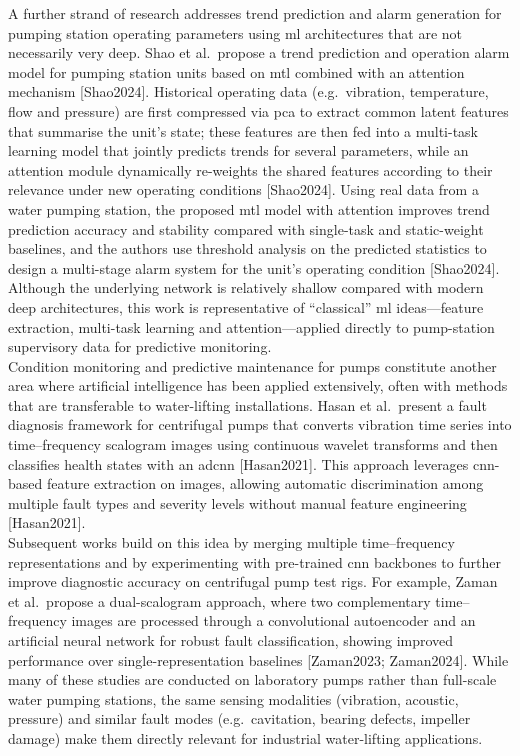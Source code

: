 A further strand of research addresses trend prediction and alarm generation for pumping station operating parameters using \acrshort{ml} architectures that are not necessarily very deep. Shao et al.\ propose a trend prediction and operation alarm model for pumping station units based on \acrfull{mtl} combined with an attention mechanism [Shao2024]. Historical operating data (e.g.\ vibration, temperature, flow and pressure) are first compressed via \acrshort{pca} to extract common latent features that summarise the unit’s state; these features are then fed into a multi-task learning model that jointly predicts trends for several parameters, while an attention module dynamically re-weights the shared features according to their relevance under new operating conditions [Shao2024]. Using real data from a water pumping station, the proposed \acrshort{mtl} model with attention improves trend prediction accuracy and stability compared with single-task and static-weight baselines, and the authors use threshold analysis on the predicted statistics to design a multi-stage alarm system for the unit’s operating condition [Shao2024]. Although the underlying network is relatively shallow compared with modern deep architectures, this work is representative of “classical” \acrshort{ml} ideas—feature extraction, multi-task learning and attention—applied directly to pump-station supervisory data for predictive monitoring.\\

Condition monitoring and predictive maintenance for pumps constitute another area where artificial intelligence has been applied extensively, often with methods that are transferable to water-lifting installations. Hasan et al.\ present a fault diagnosis framework for centrifugal pumps that converts vibration time series into time–frequency scalogram images using continuous wavelet transforms and then classifies health states with an \acrfull{adcnn} [Hasan2021]. This approach leverages \acrshort{cnn}-based feature extraction on images, allowing automatic discrimination among multiple fault types and severity levels without manual feature engineering [Hasan2021].\\ 

Subsequent works build on this idea by merging multiple time–frequency representations and by experimenting with pre-trained \acrshort{cnn} backbones to further improve diagnostic accuracy on centrifugal pump test rigs. For example, Zaman et al.\ propose a dual-scalogram approach, where two complementary time–frequency images are processed through a convolutional autoencoder and an artificial neural network for robust fault classification, showing improved performance over single-representation baselines [Zaman2023; Zaman2024]. While many of these studies are conducted on laboratory pumps rather than full-scale water pumping stations, the same sensing modalities (vibration, acoustic, pressure) and similar fault modes (e.g.\ cavitation, bearing defects, impeller damage) make them directly relevant for industrial water-lifting applications.\\

